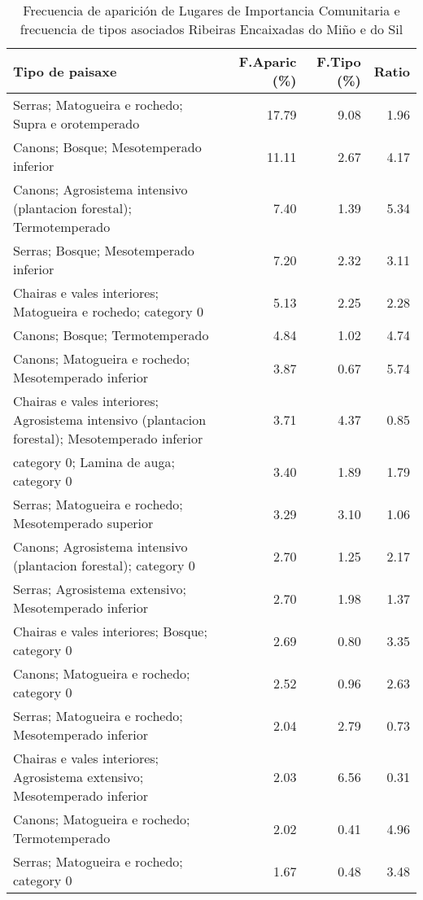 \begin{table}[p]
\centering
\caption{Frecuencia de aparición de Lugares de Importancia Comunitaria e frecuencia de tipos asociados Ribeiras Encaixadas do Miño e do Sil} 
\label{vnatura4}
\begin{tabular}{lrrr}
  \hline
Tipo de paisaxe & F.Aparic (\%) & F.Tipo (\%) & Ratio \\ 
  \hline
Serras; Matogueira e rochedo; Supra e orotemperado & 17.79 & 9.08 & 1.96 \\ 
  Canons; Bosque; Mesotemperado inferior & 11.11 & 2.67 & 4.17 \\ 
  Canons; Agrosistema intensivo (plantacion forestal); Termotemperado & 7.40 & 1.39 & 5.34 \\ 
  Serras; Bosque; Mesotemperado inferior & 7.20 & 2.32 & 3.11 \\ 
  Chairas e vales interiores; Matogueira e rochedo; category 0 & 5.13 & 2.25 & 2.28 \\ 
  Canons; Bosque; Termotemperado & 4.84 & 1.02 & 4.74 \\ 
  Canons; Matogueira e rochedo; Mesotemperado inferior & 3.87 & 0.67 & 5.74 \\ 
  Chairas e vales interiores; Agrosistema intensivo (plantacion forestal); Mesotemperado inferior & 3.71 & 4.37 & 0.85 \\ 
  category 0; Lamina de auga; category 0 & 3.40 & 1.89 & 1.79 \\ 
  Serras; Matogueira e rochedo; Mesotemperado superior & 3.29 & 3.10 & 1.06 \\ 
  Canons; Agrosistema intensivo (plantacion forestal); category 0 & 2.70 & 1.25 & 2.17 \\ 
  Serras; Agrosistema extensivo; Mesotemperado inferior & 2.70 & 1.98 & 1.37 \\ 
  Chairas e vales interiores; Bosque; category 0 & 2.69 & 0.80 & 3.35 \\ 
  Canons; Matogueira e rochedo; category 0 & 2.52 & 0.96 & 2.63 \\ 
  Serras; Matogueira e rochedo; Mesotemperado inferior & 2.04 & 2.79 & 0.73 \\ 
  Chairas e vales interiores; Agrosistema extensivo; Mesotemperado inferior & 2.03 & 6.56 & 0.31 \\ 
  Canons; Matogueira e rochedo; Termotemperado & 2.02 & 0.41 & 4.96 \\ 
  Serras; Matogueira e rochedo; category 0 & 1.67 & 0.48 & 3.48 \\ 

\end{tabular}
\end{table}
